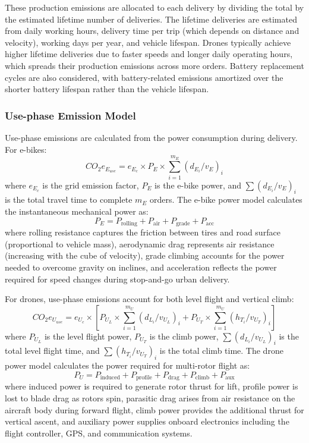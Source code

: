 \documentclass[11pt]{article}
\begin{document}
These production emissions are allocated to each delivery by dividing the total by the estimated lifetime number of deliveries. The lifetime deliveries are estimated from daily working hours, delivery time per trip (which depends on distance and velocity), working days per year, and vehicle lifespan. Drones typically achieve higher lifetime deliveries due to faster speeds and longer daily operating hours, which spreads their production emissions across more orders. Battery replacement cycles are also considered, with battery-related emissions amortized over the shorter battery lifespan rather than the vehicle lifespan.

\subsubsection{Use-phase Emission Model}

Use-phase emissions are calculated from the power consumption during delivery. For e-bikes:
\begin{equation}
  CO_2e_{E_{use}} = e_{E_c} \times P_{E} \times \sum_{i=1}^{m_E} (d_{E_i} / v_E)_i
\end{equation}
where $e_{E_c}$ is the grid emission factor, $P_E$ is the e-bike power, and $\sum (d_{E_i} / v_E)_i$ is the total travel time to complete $m_E$ orders. The e-bike power model calculates the instantaneous mechanical power as:
\begin{equation}
  P_{E} = P_{\text{rolling}} + P_{\text{air}} + P_{\text{grade}} + P_{\text{acc}}
\end{equation}
where rolling resistance captures the friction between tires and road surface (proportional to vehicle mass), aerodynamic drag represents air resistance (increasing with the cube of velocity), grade climbing accounts for the power needed to overcome gravity on inclines, and acceleration reflects the power required for speed changes during stop-and-go urban delivery.

For drones, use-phase emissions account for both level flight and vertical climb:
\begin{equation}
  CO_2e_{U_{use}} = e_{U_c} \times \left[ P_{U_L} \times \sum_{i=1}^{m_U} (d_{L_i} / v_{U_L})_i + P_{U_T} \times \sum_{i=1}^{m_U} (h_{T_i} / v_{U_T})_i \right]
\end{equation}
where $P_{U_L}$ is the level flight power, $P_{U_T}$ is the climb power, $\sum (d_{L_i} / v_{U_L})_i$ is the total level flight time, and $\sum (h_{T_i} / v_{U_T})_i$ is the total climb time. The drone power model calculates the power required for multi-rotor flight as:
\begin{equation}
  P_{U} = P_{\text{induced}} + P_{\text{profile}} + P_{\text{drag}} + P_{\text{climb}} + P_{\text{aux}}
\end{equation}
where induced power is required to generate rotor thrust for lift, profile power is lost to blade drag as rotors spin, parasitic drag arises from air resistance on the aircraft body during forward flight, climb power provides the additional thrust for vertical ascent, and auxiliary power supplies onboard electronics including the flight controller, GPS, and communication systems.
\end{document}
